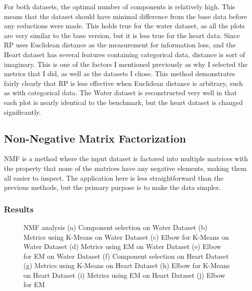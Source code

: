 \documentclass[
	letterpaper, %
]{mlreport}
\begin{document}
For both datasets, the optimal number of components is relatively high. This means that the dataset should have minimal difference from the base data before any reductions were made. This holds true for the water dataset, as all the plots are very similar to the base version, but it is less true for the heart data. Since RP uses Euclidean distance as the measurement for information loss, and the Heart dataset has several features containing categorical data, distance is sort of imaginary. This is one of the factors I mentioned previously as why I selected the metrics that I did, as well as the datasets I chose. This method demonstrates fairly clearly that RP is less effective when Euclidean distance is arbitrary, such as with categorical data. The Water dataset is reconstructed very well in that each plot is nearly identical to the benchmark, but the heart dataset is changed significantly.

\subsection{Non-Negative Matrix Factorization}
NMF is a method where the input dataset is factored into multiple matrices with the property that none of the matrices have any negative elements, making them all easier to inspect. The application here is less straightforward than the previous methods, but the primary purpose is to make the data simpler.

\subsubsection{Results}
\begin{figure}
	\centering
	\caption{NMF analysis (a) Component selection on Water Dataset (b) Metrics using K-Means on Water Dataset (c) Elbow for K-Means on Water Dataset (d) Metrics using EM on Water Dataset (e) Elbow for EM on Water Dataset (f) Component selection on Heart Dataset (g) Metrics using K-Means on Heart Dataset (h) Elbow for K-Means on Heart Dataset (i) Metrics using EM on Heart Dataset (j) Elbow for EM}
	\label{fig:fig6}
\end{figure}
\end{document}
